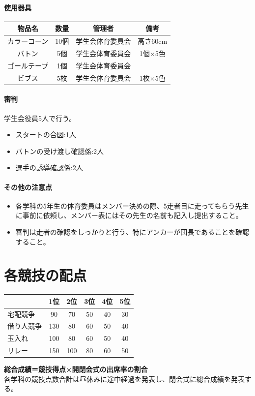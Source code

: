 \documentclass[titlepage]{jarticle}
\begin{document}
  \subsection{使用器具}
   \begin{table}[H]
    \begin{tabular}{cccc}
     物品名&数量&管理者&備考\\ \hline\hline
カラーコーン&10個&学生会体育委員会&高さ60cm\\
バトン&5個&学生会体育委員会&1個×5色\\
ゴールテープ&1個&学生会体育委員会&\\
ビブス&5枚&学生会体育委員会&1枚×5色\\
    \end{tabular}
   \end{table}
  \subsection{審判}
   学生会役員5人で行う。
   \begin{itemize}
    \item スタートの合図:1人
    \item バトンの受け渡し確認係:2人
    \item 選手の誘導確認係:2人
   \end{itemize}
  \subsection{その他の注意点}
   \begin{itemize}
    \item 各学科の5年生の体育委員はメンバー決めの際、5走者目に走ってもらう先生に事前に依頼し、メンバー表にはその先生の名前も記入し提出すること。
    \item 審判は走者の確認をしっかりと行う、特にアンカーが団長であることを確認すること。
   \end{itemize}
\clearpage
 \part*{各競技の配点}
  \begin{table}[H]
   \centering
   \begin{tabular}{l|ccccc}
    &1位&2位&3位&4位&5位\\ \hline\hline
    宅配競争&90&70&50&40&30\\
    借り人競争&130&80&60&50&40\\
    玉入れ&100&80&60&50&40\\
    リレー&150&100&80&60&50\\
   \end{tabular}
  \end{table}
{\large\bf 総合成績＝競技得点×開閉会式の出席率の割合}\\
各学科の競技点数合計は昼休みに途中経過を発表し、閉会式に総合成績を発表する。
\end{document}
